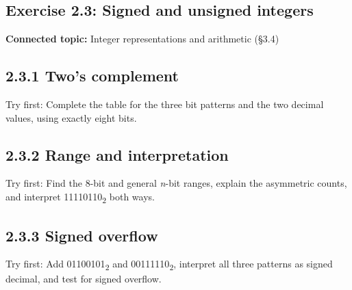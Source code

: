 \documentclass[11pt]{article}
\begin{document}
\begin{keepsection}
\section{Exercise 2.3: Signed and unsigned integers}

\textbf{Connected topic:} Integer representations and arithmetic (§3.4)

\begin{keepsection}
\subsection{2.3.1 Two’s complement}

Try first: Complete the table for the three bit patterns and the two decimal values, using exactly eight bits.

\end{keepsection}

\begin{keepsection}
\subsection{2.3.2 Range and interpretation}

Try first: Find the 8-bit and general \textit{n}-bit ranges, explain the asymmetric counts, and interpret 11110110\textsubscript{2} both ways.

\end{keepsection}

\begin{keepsection}
\subsection{2.3.3 Signed overflow}

Try first: Add 01100101\textsubscript{2} and 00111110\textsubscript{2}, interpret all three patterns as signed decimal, and test for signed overflow.

\end{keepsection}
\end{keepsection}
\end{document}
